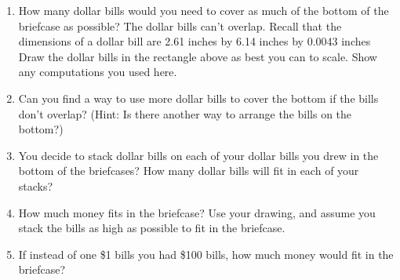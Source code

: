 \documentclass{article}
\begin{document}
\begin{enumerate}
\item How many dollar bills would you need to cover as much of the
  bottom of the briefcase as possible? The dollar bills can’t
  overlap. Recall that the dimensions of a dollar bill are 2.61 inches
  by 6.14 inches by 0.0043 inches Draw the dollar bills in the
  rectangle above as best you can to scale. Show any computations you
  used here.

  \vfill
  
\item Can you find a way to use more dollar bills to cover the bottom
  if the bills don’t overlap?  (Hint: Is there another way to arrange
  the bills on the bottom?)

  \vfill

  \clearpage
  
\item You decide to stack dollar bills on each of your dollar bills
  you drew in the bottom of the briefcases? How many dollar bills will
  fit in each of your stacks?

  \vfill
  
\item How much money fits in the briefcase? Use your drawing, and
  assume you stack the bills as high as possible to fit in the
  briefcase.

  \vfill
  
\item If instead of one \$1 bills you had \$100 bills, how much money would fit in the briefcase?

  \vfill
  
\end{enumerate}
\end{document}
